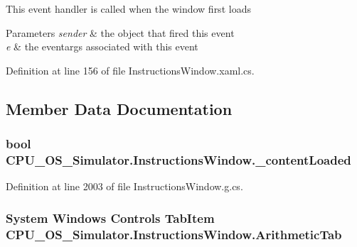 This event handler is called when the window first loads 


\begin{DoxyParams}{Parameters}
{\em sender} & the object that fired this event\\
\hline
{\em e} & the eventargs associated with this event\\
\hline
\end{DoxyParams}


Definition at line 156 of file Instructions\+Window.\+xaml.\+cs.



\subsection{Member Data Documentation}
\hypertarget{class_c_p_u___o_s___simulator_1_1_instructions_window_a7755282dffea134038e9e58c931dc297}{}
\subsubsection[{\+\_\+content\+Loaded}]{\setlength{\rightskip}{0pt plus 5cm}bool C\+P\+U\+\_\+\+O\+S\+\_\+\+Simulator.\+Instructions\+Window.\+\_\+content\+Loaded\hspace{0.3cm}{\ttfamily [private]}}\label{class_c_p_u___o_s___simulator_1_1_instructions_window_a7755282dffea134038e9e58c931dc297}


Definition at line 2003 of file Instructions\+Window.\+g.\+cs.

\hypertarget{class_c_p_u___o_s___simulator_1_1_instructions_window_aabf61d7cbf8be85bb4ab0ef2d0614b46}{}
\subsubsection[{Arithmetic\+Tab}]{\setlength{\rightskip}{0pt plus 5cm}System Windows Controls Tab\+Item C\+P\+U\+\_\+\+O\+S\+\_\+\+Simulator.\+Instructions\+Window.\+Arithmetic\+Tab\hspace{0.3cm}{\ttfamily [package]}}\label{class_c_p_u___o_s___simulator_1_1_instructions_window_aabf61d7cbf8be85bb4ab0ef2d0614b46}


